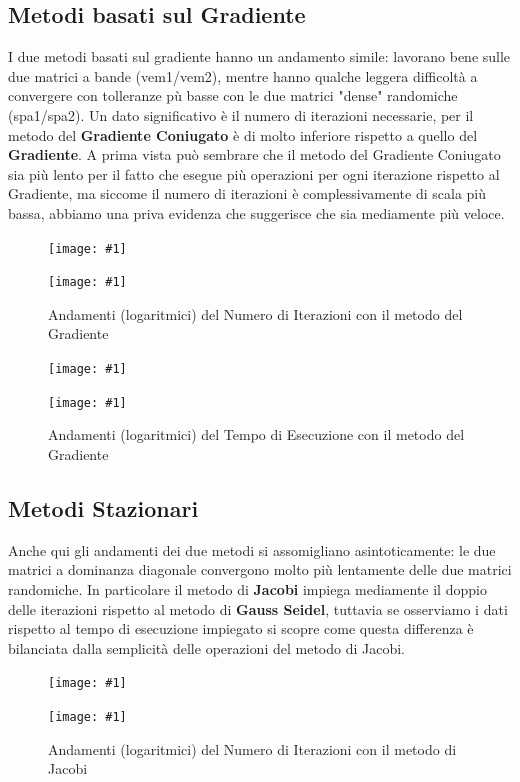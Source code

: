 \documentclass[a4paper,11pt,oneside, table]{article}
\newcommand{\putsubimage}[5] {
  \begin{minipage}{{#4}\linewidth}
	    \centering
      \texttt{[image: \#1]}
	    \caption{#2}\label{#3}
	\end{minipage}
}
\newcommand{\putimagecouple}[2] {
  \begin{figure}[!htb]
      \centering
      #1
      \hspace{0.5cm}
      #2
  \end{figure}
}
\begin{document}
\subsection{Metodi basati sul Gradiente}

I due metodi basati sul gradiente hanno un andamento simile: lavorano bene sulle due matrici a bande (vem1/vem2), mentre hanno qualche leggera difficolt\`a a convergere con tolleranze p\`u basse con le due matrici "dense" randomiche (spa1/spa2).
Un dato significativo \`e il numero di iterazioni necessarie, per il metodo del \textbf{Gradiente Coniugato} \`e di molto inferiore rispetto a quello del \textbf{Gradiente}. A prima vista pu\`o sembrare che il metodo del Gradiente Coniugato sia pi\`u lento per il fatto che esegue pi\`u operazioni per ogni iterazione rispetto al Gradiente, ma siccome il numero di iterazioni \`e complessivamente di scala pi\`u bassa, abbiamo una priva evidenza che suggerisce che sia mediamente pi\`u veloce.

\putimagecouple
  {\putsubimage{./images/it-re-cge.png}{Andamenti (logaritmici) del Numero di Iterazioni con il metodo del Gradiente Coniugato}{png:it-re-cge}{0.4}{0.99}}
  {\putsubimage{./images/it-re-gre.png}{Andamenti (logaritmici) del Numero di Iterazioni con il metodo del Gradiente}{png:it-re-gre}{0.4}{0.99}}

\putimagecouple
  {\putsubimage{./images/te-re-cge.png}{Andamenti (logaritmici) del Tempo di Esecuzione con il metodo del Gradiente Coniugato}{png:te-re-cge}{0.4}{0.99}}
  {\putsubimage{./images/te-re-gre.png}{Andamenti (logaritmici) del Tempo di Esecuzione con il metodo del Gradiente}{png:te-re-gre}{0.4}{0.99}}

\subsection{Metodi Stazionari}

Anche qui gli andamenti dei due metodi si assomigliano asintoticamente: le due matrici a dominanza diagonale convergono molto pi\`u lentamente delle due matrici randomiche. In particolare il metodo di \textbf{Jacobi} impiega mediamente il doppio delle iterazioni rispetto al metodo di \textbf{Gauss Seidel}, tuttavia se osserviamo i dati rispetto al tempo di esecuzione impiegato si scopre come questa differenza \`e bilanciata dalla semplicit\`a delle operazioni del metodo di Jacobi.

\putimagecouple
  {\putsubimage{./images/it-re-gse.png}{Andamenti (logaritmici) del Numero di Iterazioni con il metodo di Gauss Seidel}{png:it-re-gse}{0.4}{0.99}}
  {\putsubimage{./images/it-re-jae.png}{Andamenti (logaritmici) del Numero di Iterazioni con il metodo di Jacobi}{png:it-re-jae}{0.4}{0.99}}
\end{document}
